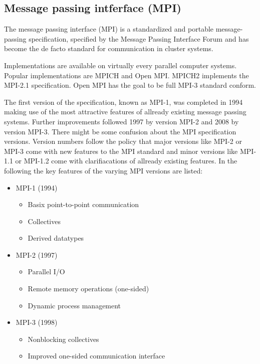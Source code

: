 \subsection{Message passing intferface (MPI)}
\label{sec:mpi}

The message passing interface (MPI) is a standardized and portable
message-passing specification, specified by the Message Passing
Interface Forum \cite{ref:mpi_specification} and has become
the de facto standard for communication in cluster systems. 

Implementations are available on virtually every parallel computer systems.
Popular implementations are MPICH and Open MPI. MPICH2 implements the
MPI-2.1 specification. Open MPI has the goal to be full MPI-3 standard conform.

The first version of the specification, known as MPI-1, was completed
in 1994 making use of the most attractive features of allready
existing message passing systems.  Further improvements followed 1997
by version MPI-2 and 2008 by version MPI-3. There might be some
confusion about the MPI specification versions. Version numbers follow
the policy that major versions like MPI-2 or MPI-3 come with new
features to the MPI standard and minor versions like MPI-1.1 or
MPI-1.2 come with clarifiacations of allready existing features. In
the following the key features of the varying MPI versions are listed:

\begin{itemize}
  \item MPI-1 (1994)
    \begin{itemize}
      \item Basix point-to-point communication
      \item Collectives
      \item Derived datatypes
    \end{itemize}
  \item MPI-2 (1997)
    \begin{itemize}
      \item Parallel I/O
      \item Remote memory operations (one-sided)
      \item Dynamic process management
    \end{itemize}
  \item MPI-3 (1998)
    \begin{itemize}
      \item Nonblocking collectives
      \item Improved one-sided communication interface
    \end{itemize}
\end{itemize}

